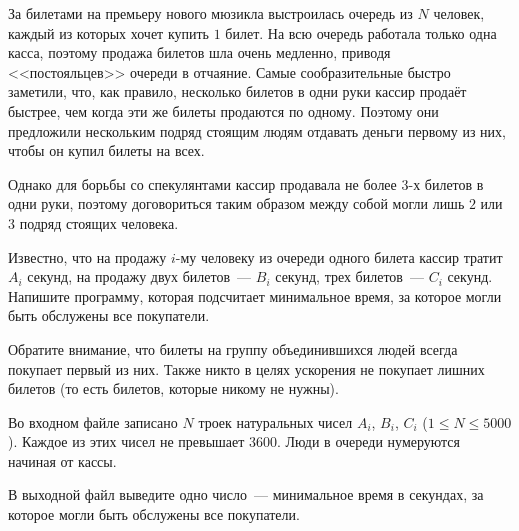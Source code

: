 

За билетами на премьеру нового мюзикла выстроилась очередь из $N$ человек, каждый из которых хочет купить $1$ билет. На всю очередь работала только одна касса, поэтому продажа билетов шла очень медленно, приводя <<постояльцев>> очереди в отчаяние. 
Самые сообразительные быстро заметили, что, как правило, несколько билетов в одни руки кассир продаёт быстрее, чем когда эти же билеты продаются по одному. Поэтому они предложили нескольким подряд стоящим людям отдавать деньги первому из них, чтобы он купил билеты на всех. 

Однако для борьбы со спекулянтами кассир продавала не более $3$-х билетов в одни руки, поэтому договориться таким образом между собой могли лишь $2$ или $3$ подряд стоящих человека.

Известно, что на продажу $i$-му человеку из очереди одного билета кассир тратит $A_i$ секунд, на продажу двух билетов~--- $B_i$ секунд, трех билетов~--- $C_i$ секунд. Напишите программу, которая подсчитает минимальное время, за которое могли быть обслужены все покупатели.

Обратите внимание, что билеты на группу объединившихся людей всегда покупает первый из них. Также никто в целях ускорения не покупает лишних билетов (то есть билетов, которые никому не нужны).

\InputFile
Во входном файле записано $N$ троек натуральных чисел $A_i$, $B_i$, $C_i$ ($1 \leqslant N \leqslant 5000$). Каждое из этих чисел не превышает $3600$.
 Люди в очереди нумеруются начиная от кассы.

\OutputFile
В выходной файл выведите одно число~--- минимальное время в секундах, за которое могли быть обслужены все покупатели.

